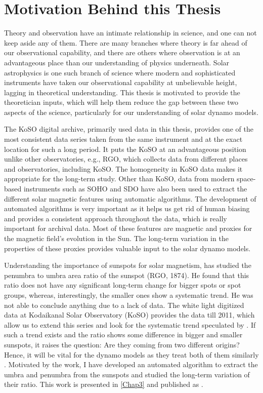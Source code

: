 \section{Motivation Behind this Thesis}
Theory and observation have an intimate relationship in science, and one can not keep aside any of them. There are many branches where theory is far ahead of our observational capability, and there are others where observation is at an advantageous place than our understanding of physics underneath. Solar astrophysics is one such branch of science where modern and sophisticated instruments have taken our observational capability at unbelievable height, lagging in theoretical understanding. This thesis is motivated to provide the theoretician inputs, which will help them reduce the gap between these two aspects of the science, particularly for our understanding of solar dynamo models.

The KoSO digital archive, primarily used data in this thesis, provides one of the most consistent data series taken from the same instrument and at the exact location for such a long period. It puts the KoSO at an advantageous position unlike other observatories, e.g., RGO, which collects data from different places and observatories, including KoSO. The homogeneity in KoSO data makes it appropriate for the long\hyp term study. Other than KoSO, data from modern space-based instruments such as SOHO and SDO have also been used to extract the different solar magnetic features using automatic algorithms. The development of automated algorithms is very important as it helps us get rid of human biasing and provides a consistent approach throughout the data, which is really important for archival data. Most of these features are magnetic and proxies for the magnetic field's evolution in the Sun. The long\hyp term variation in the properties of these proxies provides valuable input to the solar dynamo models.
 
  


Understanding the importance of sunspots for solar magnetism, \citet{Hathaway2013} has studied the penumbra to umbra area ratio of the sunspot (RGO, 1874). He found that this ratio does not have any significant long\hyp term change for bigger spots or spot groups, whereas, interestingly, the smaller ones show a systematic trend. He was not able to conclude anything due to a lack of data. The white light digitized data at Kodaikanal Solar Observatory (KoSO) provides the data till 2011, which allow us to extend this series and look for the systematic trend speculated by \citet{Hathaway2013}. If such a trend exists and the ratio shows some difference in bigger and smaller sunspots, it raises the question: Are they coming from two different origins? Hence, it will be vital for the dynamo models as they treat both of them similarly \citep{Charbonneau2010, Hathaway2015}. Motivated by the work, I have developed an automated algorithm to extract the umbra and penumbra from the sunspots and studied the long\hyp term variation of their ratio. This work is presented in \autoref{Chap3} and published as \citet{Jha2018, Jha2019}.

